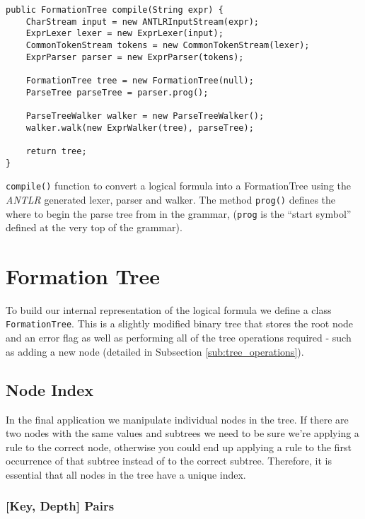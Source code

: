 \documentclass{report}
\begin{document}
\begin{listing}[ht]
\begin{verbatim}
public FormationTree compile(String expr) {
    CharStream input = new ANTLRInputStream(expr);
    ExprLexer lexer = new ExprLexer(input);
    CommonTokenStream tokens = new CommonTokenStream(lexer);
    ExprParser parser = new ExprParser(tokens);
    
    FormationTree tree = new FormationTree(null);
    ParseTree parseTree = parser.prog();
    
    ParseTreeWalker walker = new ParseTreeWalker();
    walker.walk(new ExprWalker(tree), parseTree);

    return tree;
}
\end{verbatim}
\caption{{\tt compile()} function to convert a logical formula into a FormationTree using the \emph{ANTLR} generated lexer, parser and walker. The method {\tt prog()} defines the  where to begin the parse tree from in the grammar, ({\tt prog} is the ``start symbol'' defined at the very top of the grammar).}
\label{compile()}
\end{listing}

\section{Formation Tree}
\label{sec:formation_tree}

To build our internal representation of the logical formula we define a class {\tt FormationTree}. This is a slightly modified binary tree that stores the root node and an error flag as well as performing all of the tree operations required - such as adding a new node (detailed in Subsection \ref{sub:tree_operations}).

\subsection{Node Index}
\label{sub:node_index}

In the final application we manipulate individual nodes in the tree. If there are two nodes with the same values and subtrees we need to be sure we're applying a rule to the correct node, otherwise you could end up applying a rule to the first occurrence of that subtree instead of to the correct subtree. Therefore, it is essential that all nodes in the tree have a unique index.

\subsubsection{[Key, Depth] Pairs}
\end{document}
